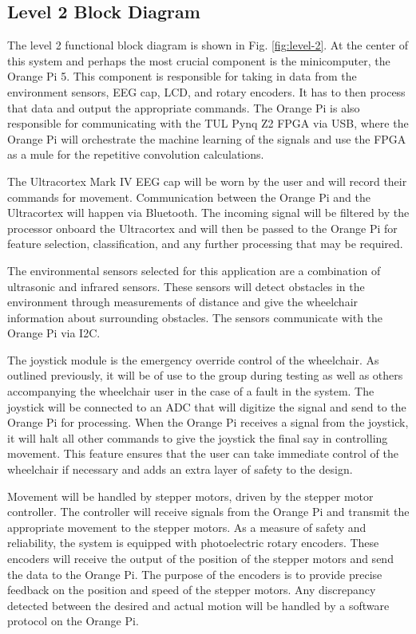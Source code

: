 \documentclass[conference]{IEEEtran}
\begin{document}
    \subsection{Level 2 Block Diagram}
    The level 2 functional block diagram is shown in Fig. \ref{fig:level-2}. At the center of this system and perhaps the most crucial component is the minicomputer, the Orange Pi 5. This component is responsible for taking in data from the environment sensors, EEG cap, LCD, and rotary encoders. It has to then process that data and output the appropriate commands. The Orange Pi is also responsible for communicating with the TUL Pynq Z2 FPGA via USB, where the Orange Pi will orchestrate the machine learning of the signals and use the FPGA as a mule for the repetitive convolution calculations. 

    The Ultracortex Mark IV EEG cap will be worn by the user and will record their commands for movement. Communication between the Orange Pi and the Ultracortex will happen via Bluetooth. The incoming signal will be filtered by the processor onboard the Ultracortex and will then be passed to the Orange Pi for feature selection, classification, and any further processing that may be required. 
    
    The environmental sensors selected for this application are a combination of ultrasonic and infrared sensors. These sensors will detect obstacles in the environment through measurements of distance and give the wheelchair information about surrounding obstacles. The sensors communicate with the Orange Pi via I2C.

    The joystick module is the emergency override control of the wheelchair. As outlined previously, it will be of use to the group during testing as well as others accompanying the wheelchair user in the case of a fault in the system. The joystick will be connected to an ADC that will digitize the signal and send to the Orange Pi for processing. When the Orange Pi receives a signal from the joystick, it will halt all other commands to give the joystick the final say in controlling movement. This feature ensures that the user can take immediate control of the wheelchair if necessary and adds an extra layer of safety to the design.

    Movement will be handled by stepper motors, driven by the stepper motor controller. The controller will receive signals from the Orange Pi and transmit the appropriate movement to the stepper motors. As a measure of safety and reliability, the system is equipped with photoelectric rotary encoders. These encoders will receive the output of the position of the stepper motors and send the data to the Orange Pi. The purpose of the encoders is to provide precise feedback on the position and speed of the stepper motors. Any discrepancy detected between the desired and actual motion will be handled by a software protocol on the Orange Pi. 
\end{document}
